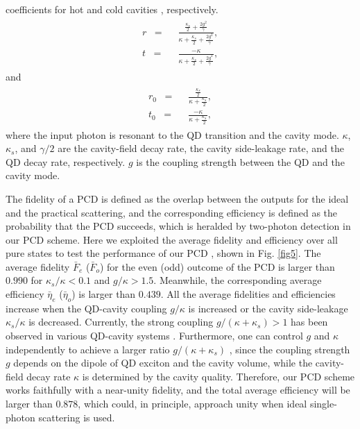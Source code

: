 \documentclass[aps,graphicx,twocolumn]{revtex4}%
\begin{document}
coefficients for hot and cold cavities \cite{QR1,QR2,QD2,QD.2}, respectively.
\begin{eqnarray}   %
\begin{split}
r\;\;=\;\;&\frac{\frac{\kappa_s}{2}+\frac{2g^{2}}{\gamma}}{\kappa+\frac{\kappa_s}{2}+\frac{2g^{2}}{\gamma}}, \\
t\;\;=\;\;&\frac{-\kappa}
{\kappa+\frac{\kappa_s}{2}+\frac{2g^{2}}{\gamma}},
 \label{hotrt}
\end{split}
\end{eqnarray}
and
\begin{eqnarray}   %
\begin{split}
r_0\;\;=\;\;&\frac{\frac{\kappa_s}{2}}{\kappa+\frac{\kappa_s}{2}}, \\
t_0\;\;=\;\;&\frac{-\kappa}
{\kappa+\frac{\kappa_s}{2}},
 \label{coldrt}
\end{split}
\end{eqnarray}
where the input photon is resonant to the QD transition and the cavity mode. $\kappa$, $\kappa_s$, and $\gamma/2$  are the cavity-field decay
rate, the cavity side-leakage rate, and   the QD decay rate, respectively. $g$ is the coupling
strength between the QD and the cavity mode.


The fidelity of a PCD is defined as the overlap between the outputs for the ideal and the practical scattering, and the corresponding efficiency is defined as the probability that the PCD succeeds, which is heralded by two-photon detection in our PCD scheme. Here we exploited the average fidelity and efficiency over all pure states to test the performance of our PCD \cite{Nielsen1}, shown in Fig. \ref{fig5}. The average fidelity $\bar{F}_e$ ($\bar{F}_o$) for the even (odd) outcome of the PCD is larger than $0.990$ for $\kappa_s/\kappa<0.1$  and $g/\kappa>1.5$. Meanwhile, the corresponding  average efficiency $\bar{\eta}_e$ ($\bar{\eta}_o$) is larger than $0.439$. All the average fidelities and efficiencies increase when the QD-cavity coupling $g/\kappa$ is increased or the cavity side-leakage $\kappa_s/\kappa$ is decreased. Currently, the strong coupling $g/(\kappa+\kappa_s)>1$ has been observed in various QD-cavity systems \cite{QDStron1,QDStron2,QDStron3}. Furthermore, one can control $g$ and $\kappa$ independently to achieve a larger ratio $g/(\kappa+\kappa_s)$ \cite{tuneRatio}, since the coupling strength $g$ depends on the dipole of QD exciton and the cavity volume, while the cavity-field
decay rate $\kappa$ is determined by the cavity quality. Therefore, our PCD scheme   works faithfully with a near-unity fidelity, and the total average efficiency will be larger than $0.878$, which could, in principle, approach unity when ideal single-photon scattering is used.
\end{document}

